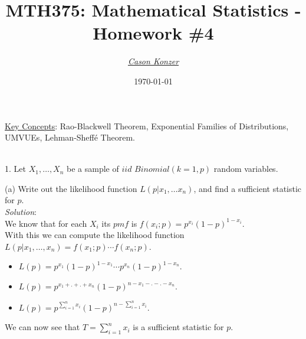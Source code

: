 \documentclass[12pt]{article}
\newcommand{\XB}{\color{black}}
\newcommand{\XBB}{\color{blue}}
\newcommand{\XV}{\color{violet}}
\newcommand{\ds}{\displaystyle}
\begin{document}
\title{\textbf{MTH375}: Mathematical Statistics - Homework \#4}
\date{\today}
\author{\XV\textit{\large{\href{https://github.com/casonk}{Cason Konzer}}}\XB}

\maketitle
\hrulefill
\vfill 
    \underline{Key Concepts}: Rao-Blackwell Theorem, Exponential Families of Distributions, UMVUEs, Lehman-Sheff\'e Theorem.

\newpage
\newpage
\XBB\hrulefill\XB \\

1. Let $ X_{1}, \dots , X_{n} $ be a sample of $ iid $ $ Binomial(k=1, p) $ random variables. \\

\XBB\hrulefill\XB 
\vspace{5mm}

(a) Write out the likelihood function $ L(p | x_{1}, \dots x_{n}) $, and find a sufficient statistic for $ p $.
\vspace{2.5mm} \\
\textit{Solution}:
\vspace{2.5mm} \\

\noindent
We know that for each $ X_{i} $ its $ pmf $ is $ f(x_{i}; p) = p^{x_{i}}(1 - p)^{1 - x_{i}} $. \\

With this we can compute the likelihood function $ L(p | x_{1}, \dots, x_{n}) = f(x_{1}; p) \cdots f(x_{n}; p) $.

\begin{itemize}
    \item $ \ds L(p) = p^{x_{1}}(1 - p)^{1 - x_{1}} \cdots p^{x_{n}}(1 - p)^{1 - x_{n}} $.
    \item $ \ds L(p) = p^{x_{1} + . + . + x_{n}}(1 - p)^{n - x_{1} - . - . - x_{n}} $.
    \item $ \ds L(p) = p^{\sum_{i=1}^{n} x_{i}}(1 - p)^{n - \sum_{i=1}^{n} x_{i}} $.
\end{itemize} 

\noindent
We can now see that $ \ds T = \sum_{i=1}^{n} x_{i} $ is a sufficient statistic for $ p $. \\

\vspace{2.5mm}
\end{document}
